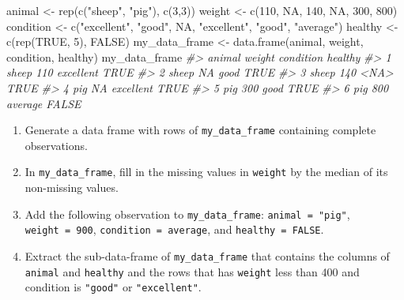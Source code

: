 \documentclass[
]{book}
\newenvironment{Shaded}{\begin{snugshade}}{\end{snugshade}}
\newcommand{\CommentTok}[1]{\textcolor[rgb]{0.56,0.35,0.01}{\textit{#1}}}
\newcommand{\ConstantTok}[1]{\textcolor[rgb]{0.00,0.00,0.00}{#1}}
\newcommand{\DecValTok}[1]{\textcolor[rgb]{0.00,0.00,0.81}{#1}}
\newcommand{\FunctionTok}[1]{\textcolor[rgb]{0.00,0.00,0.00}{#1}}
\newcommand{\NormalTok}[1]{#1}
\newcommand{\OtherTok}[1]{\textcolor[rgb]{0.56,0.35,0.01}{#1}}
\newcommand{\StringTok}[1]{\textcolor[rgb]{0.31,0.60,0.02}{#1}}
\providecommand{\tightlist}{%
  \setlength{\itemsep}{0pt}\setlength{\parskip}{0pt}}
\begin{document}
\begin{Shaded}
\begin{Highlighting}[]
\NormalTok{animal }\OtherTok{\textless{}{-}} \FunctionTok{rep}\NormalTok{(}\FunctionTok{c}\NormalTok{(}\StringTok{"sheep"}\NormalTok{, }\StringTok{"pig"}\NormalTok{), }\FunctionTok{c}\NormalTok{(}\DecValTok{3}\NormalTok{,}\DecValTok{3}\NormalTok{))}
\NormalTok{weight }\OtherTok{\textless{}{-}} \FunctionTok{c}\NormalTok{(}\DecValTok{110}\NormalTok{, }\ConstantTok{NA}\NormalTok{, }\DecValTok{140}\NormalTok{, }\ConstantTok{NA}\NormalTok{, }\DecValTok{300}\NormalTok{, }\DecValTok{800}\NormalTok{)}
\NormalTok{condition }\OtherTok{\textless{}{-}} \FunctionTok{c}\NormalTok{(}\StringTok{"excellent"}\NormalTok{, }\StringTok{"good"}\NormalTok{, }\ConstantTok{NA}\NormalTok{, }\StringTok{"excellent"}\NormalTok{, }\StringTok{"good"}\NormalTok{, }\StringTok{"average"}\NormalTok{)}
\NormalTok{healthy }\OtherTok{\textless{}{-}} \FunctionTok{c}\NormalTok{(}\FunctionTok{rep}\NormalTok{(}\ConstantTok{TRUE}\NormalTok{, }\DecValTok{5}\NormalTok{), }\ConstantTok{FALSE}\NormalTok{)}
\NormalTok{my\_data\_frame }\OtherTok{\textless{}{-}} \FunctionTok{data.frame}\NormalTok{(animal, weight, condition, healthy)}
\NormalTok{my\_data\_frame}
\CommentTok{\#\textgreater{}   animal weight condition healthy}
\CommentTok{\#\textgreater{} 1  sheep    110 excellent    TRUE}
\CommentTok{\#\textgreater{} 2  sheep     NA      good    TRUE}
\CommentTok{\#\textgreater{} 3  sheep    140      \textless{}NA\textgreater{}    TRUE}
\CommentTok{\#\textgreater{} 4    pig     NA excellent    TRUE}
\CommentTok{\#\textgreater{} 5    pig    300      good    TRUE}
\CommentTok{\#\textgreater{} 6    pig    800   average   FALSE}
\end{Highlighting}
\end{Shaded}

\begin{enumerate}
\def\labelenumi{\arabic{enumi}.}
\tightlist
\item
  Generate a data frame with rows of \texttt{my\_data\_frame} containing complete observations.
\item
  In \texttt{my\_data\_frame}, fill in the missing values in \texttt{weight} by the median of its non-missing values.
\item
  Add the following observation to \texttt{my\_data\_frame}: \texttt{animal\ =\ "pig"}, \texttt{weight\ =\ 900}, \texttt{condition\ =\ average}, and \texttt{healthy\ =\ FALSE}.
\item
  Extract the sub-data-frame of \texttt{my\_data\_frame} that contains the columns of \texttt{animal} and \texttt{healthy} and the rows that has \texttt{weight} less than 400 and condition is \texttt{"good"} or \texttt{"excellent"}.
\end{enumerate}
\end{document}

